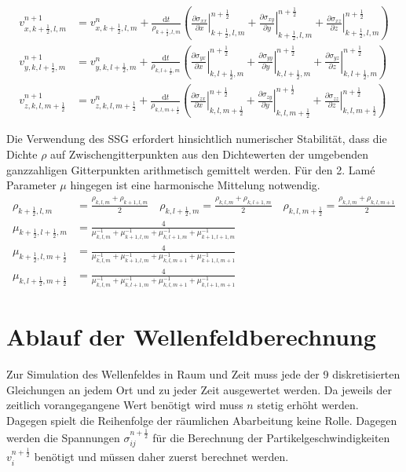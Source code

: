 \documentclass[pdftex,a4paper,parskip,listof=totoc,bibliography=totoc,onehalfspacing,12pt]{scrreprt}
\begin{document}
\begin{align*}
	v_{x,k+\frac{1}{2},l,m}^{n+1} &= v_{x,k+\frac{1}{2},l,m}^n + \frac{\mathrm{d}t}{\rho_{k+\frac{1}{2},l,m}}  \left( \left.\frac{\partial\sigma_{xx}}{\partial x}\right\rvert_{k+\frac{1}{2},l,m}^{n+\frac{1}{2}} + \left.\frac{\partial\sigma_{xy}}{\partial y}\right\rvert_{k+\frac{1}{2},l,m}^{n+\frac{1}{2}} + \left.\frac{\partial\sigma_{xz}}{\partial z}\right\rvert_{k+\frac{1}{2},l,m}^{n+\frac{1}{2}} \right)\\
	v_{y,k,l+\frac{1}{2},m}^{n+1} &= v_{y,k,l+\frac{1}{2},m}^n + \frac{\mathrm{d}t}{\rho_{k,l+\frac{1}{2},m}}  \left( \left.\frac{\partial\sigma_{yx}}{\partial x}\right\rvert_{k,l+\frac{1}{2},m}^{n+\frac{1}{2}} + \left.\frac{\partial\sigma_{yy}}{\partial y}\right\rvert_{k,l+\frac{1}{2},m}^{n+\frac{1}{2}} + \left.\frac{\partial\sigma_{yz}}{\partial z}\right\rvert_{k,l+\frac{1}{2},m}^{n+\frac{1}{2}} \right)\\
	v_{z,k,l,m+\frac{1}{2}}^{n+1} &= v_{z,k,l,m+\frac{1}{2}}^n + \frac{\mathrm{d}t}{\rho_{k,l,m+\frac{1}{2}}}  \left( \left.\frac{\partial\sigma_{zx}}{\partial x}\right\rvert_{k,l,m+\frac{1}{2}}^{n+\frac{1}{2}} + \left.\frac{\partial\sigma_{zy}}{\partial y}\right\rvert_{k,l,m+\frac{1}{2}}^{n+\frac{1}{2}} + \left.\frac{\partial\sigma_{zz}}{\partial z}\right\rvert_{k,l,m+\frac{1}{2}}^{n+\frac{1}{2}} \right)
\end{align*}


Die Verwendung des SSG erfordert hinsichtlich numerischer Stabilität, dass die Dichte $\rho$ auf Zwischengitterpunkten aus den Dichtewerten der umgebenden ganzzahligen Gitterpunkten arithmetisch gemittelt werden. Für den 2. Lamé Parameter $\mu$ hingegen ist eine harmonische Mittelung notwendig.
\begin{align*}
	\rho_{k+\frac{1}{2},l,m} &= \frac{\rho_{k,l,m} + \rho_{k+1,l,m}}{2} \quad \rho_{k,l+\frac{1}{2},m} = \frac{\rho_{k,l,m} + \rho_{k,l+1,m}}{2} \quad \rho_{k,l,m+\frac{1}{2}} = \frac{\rho_{k,l,m} + \rho_{k,l,m+1}}{2}\\
	\mu_{k+\frac{1}{2},l+\frac{1}{2},m} &= \frac{4}{\mu^{-1}_{k,l,m} + \mu^{-1}_{k+1,l,m} + \mu^{-1}_{k,l+1,m} + \mu^{-1}_{k+1,l+1,m}}\\
	\mu_{k+\frac{1}{2},l,m+\frac{1}{2}} &= \frac{4}{\mu^{-1}_{k,l,m} + \mu^{-1}_{k+1,l,m} + \mu^{-1}_{k,l,m+1} + \mu^{-1}_{k+1,l,m+1}}\\
	\mu_{k,l+\frac{1}{2},m+\frac{1}{2}} &= \frac{4}{\mu^{-1}_{k,l,m} + \mu^{-1}_{k,l+1,m} + \mu^{-1}_{k,l,m+1} + \mu^{-1}_{k,l+1,m+1}}
\end{align*}

\section{Ablauf der Wellenfeldberechnung}
Zur Simulation des Wellenfeldes in Raum und Zeit muss jede der 9 diskretisierten Gleichungen an jedem Ort und zu jeder Zeit ausgewertet werden. Da jeweils der zeitlich vorangegangene Wert benötigt wird muss $n$ stetig erhöht werden. Dagegen spielt die Reihenfolge der räumlichen Abarbeitung keine Rolle. Dagegen werden die Spannungen $\sigma_{ij}^{n+\frac{1}{2}}$ für die Berechnung der Partikelgeschwindigkeiten $v_i^{n+\frac{1}{2}}$ benötigt und müssen daher zuerst berechnet werden.
\end{document}
